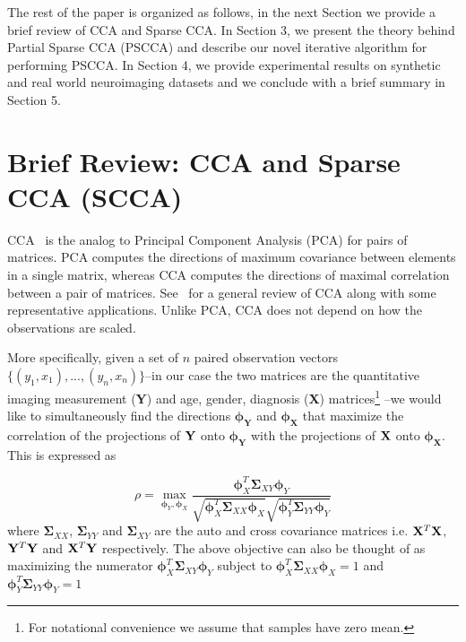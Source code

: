 \documentclass{llncs}
\newcommand{\X}{{\bf X}}
\newcommand{\Y}{{\bf Y}}
\newcommand{\bs}{\boldsymbol}
\begin{document}
The rest of the paper is organized as follows, in the next Section we provide a brief review of CCA and Sparse CCA. In Section 3, we present the theory behind Partial Sparse CCA (PSCCA) and describe our novel iterative algorithm for performing PSCCA. In Section 4, we provide experimental results on synthetic and real world neuroimaging datasets and we conclude with a brief summary in Section 5.




\section{Brief Review: CCA and Sparse CCA (SCCA)}

CCA~\cite{hotellingcca} is the analog to Principal
Component Analysis (PCA) for pairs of matrices. PCA
computes the directions of maximum covariance between elements in a
single matrix, whereas CCA computes the directions of maximal correlation
between a pair of matrices. 
See~\cite{taylor:cca} for a general review of CCA along with some representative applications. 
Unlike PCA, CCA does not depend on how the observations
are scaled.  

More specifically, given a set of $n$ paired observation vectors
$\{(y_1,x_1),...,(y_n,x_n)\}$--in our case the two matrices are the
quantitative imaging measurement ({\Y}) and age, gender, diagnosis ({\X}) matrices\footnote{For
  notational convenience we assume that samples have zero mean.} --we would like to simultaneously find the directions
${\bs{\bs\phi_Y}}$ and
${\bs{\bs\phi_X}}$ that maximize the correlation of
the projections of ${\Y}$ onto ${\bs{\bs\phi_Y}}$
with the projections of ${\X}$ onto
${\bs{\bs\phi_X}}$. This is expressed as

\begin{equation}
\label{cca1}
\rho=\max_{{\bs\phi_Y}, {\bs\phi_X}}
\frac{{\bs\phi_X^T\bs\Sigma_{XY}}\bs\phi_Y}{\sqrt{\bs\phi_X^T\bs\Sigma_{XX}\bs\phi_X}\sqrt{\bs\phi_Y^T\bs\Sigma_{YY}\bs\phi_Y}}
\end{equation}
where ${\bs\Sigma_{XX}}$, ${\bs\Sigma_{YY}}$ and ${\bs\Sigma_{XY}}$ are the auto and cross covariance matrices i.e. $\X^T\X$, $\Y^T\Y$ and $\X^T\Y$ respectively. The above objective can also be thought of as maximizing the numerator $\bs\phi_X^T\bs\Sigma_{XY}\bs\phi_Y$ subject to $\bs\phi_X^T\bs\Sigma_{XX}\bs\phi_X =1$ and $\bs\phi_Y^T\bs\Sigma_{YY}\bs\phi_Y=1$
\end{document}
